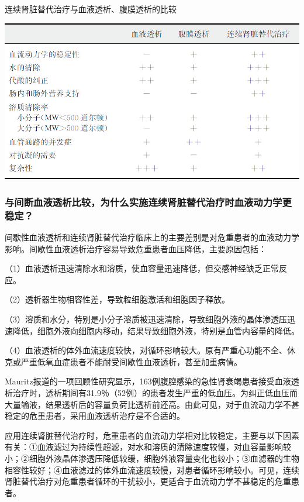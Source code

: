 \begin{table}[htbp]
\centering
\caption{连续肾脏替代治疗与血液透析、腹膜透析的比较}
\label{tab12-1}
\includegraphics{./images/Image00093.jpg}
\end{table}

\subsubsection{与间断血液透析比较，为什么实施连续肾脏替代治疗时血液动力学更稳定？}

间歇性血液透析和连续肾脏替代治疗临床上的主要差别是对危重患者的血液动力学影响。间歇性血液透析治疗容易导致危重患者血压降低，主要原因包括：

（1）血液透析迅速清除水和溶质，使血容量迅速降低，但交感神经缺乏正常反应。

（2）透析器生物相容性差，导致粒细胞激活和细胞因子释放。

（3）溶质和水分，特别是小分子溶质被迅速清除，导致细胞外液的晶体渗透压迅速降低，细胞外液向细胞内移动，结果导致细胞外液，特别是血管内容量的降低。

（4）血液透析的体外血流速度较快，对循环影响较大。原有严重心功能不全、休克或严重低氧血症患者不能耐受间歇性血液透析，甚至加重病情。

Mauritz报道的一项回顾性研究显示，163例腹腔感染的急性肾衰竭患者接受血液透析治疗时，透析期间有31.9％（52例）的患者发生严重的低血压。为纠正低血压而大量输液，结果透析后的容量负荷比透析前还高。由此可见，对于血流动力学不甚稳定的危重患者，采用血液透析治疗是不合适的。

应用连续肾脏替代治疗时，危重患者的血流动力学相对比较稳定，主要与以下因素有关：①血液滤过为持续性超滤，对水和溶质的清除速度较慢，对血容量影响较小；②细胞外液晶体渗透压降低较缓，细胞外液容量变化也较小；③血滤器的生物相容性较好；④血液滤过的体外血流速度较慢，对患者循环影响较小。可见，连续肾脏替代治疗对危重患者循环的干扰较小，更适合于血流动力学不甚稳定的危重患者。

